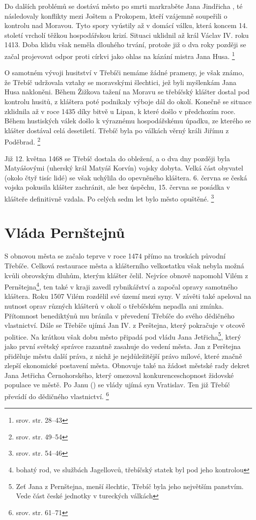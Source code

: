\documentclass[a4paper,oneside,12pt]{report}
\begin{document}
Do dalších problémů se dostává město po smrti markraběte Jana Jindřicha , té následovaly konflikty mezi Joštem a Prokopem, kteří vzájemně soupeřili o kontrolu nad Moravou.
Tyto spory vyústily až v domácí válku, která koncem 14. století vrcholí těžkou hospodářskou krizí.
Situaci uklidnil až král Václav IV. roku 1413.
Doba klidu však neměla dlouhého trvání, protože již o dva roky později se začal projevovat odpor proti církvi jako ohlas na kázání mistra Jana Husa. \footnote{srov. \cite{Uhlir1978} str. 28--43}

O samotném vývoji husitství v Třebíči nemáme žádné prameny, je však známo, že Třebíč udržovala vztahy se moravskými šlechtici, jež byli myšlenkám Jana Husa nakloněni.
Během Žižkova tažení na Moravu se třebíčský klášter dostal pod kontrolu husitů, z kláštera poté podnikaly výboje dál do okolí.
Konečně se situace zklidnila až v roce 1435 díky bitvě u Lipan, k které došlo v předchozím roce.
Během hustiských válek došlo k výraznému hospodářskému úpadku, ze kterého se klášter dostával celá desetiletí.
Třebíč byla po válkách věrný králi Jiřímu z Poděbrad. \footnote{srov.  str. 49--54}

Již 12. května 1468 se Třebíč dostala do obležení, a o dva dny později byla Matyášovými (uherský král Matyáš Korvín) vojsky dobyta.
Velká část obyvatel (okolo čtyř tisíc lidé) se však uchýlila do opevněného kláštera.
6. června se česká vojska pokusila klášter zachránit, ale bez úspěchu, 15. června se posádka v klášteře definitivně vzdala.
Po celých sedm let bylo město opuštěné. \footnote{srov.  str. 54--46}

\section{Vláda Pernštejnů}

S obnovou města se začalo teprve v roce 1474 přímo na troskách původní Třebíče.
Celková restaurace města a klášterního velkostatku však nebyla možná kvůli obrovským dluhům, kterým klášter čelil.
Nejvíce obnově napomohl Vilém z Pernštejna\footnote{bohatý rod, ve službách Jagellovců, třebíčský statek byl pod jeho kontrolou}, ten také v kraji zavedl rybnikářství a započal opravy samotného kláštera.
Roku 1507 Vilém rozdělil své území mezi syny. V závěti také apeloval na nutnost oprav různých klášterů v okolí o třebíčském nepadla ani zmínka.
Přítomnost benediktýnů mu bránila v převedení Třebíče do svého dědičného vlastnictví.
Dále se Třebíče ujímá Jan IV. z Perštejna, který pokračuje v otcově politice.
Na krátkou však dobu město připadá pod vládu Jana Jetřicha\footnote{Zeť Jana z Pernštejna, menší šlechtic, Třebíč byla jeho největším panstvím. Vede část české jednotky v tureckých válkách}, který jako první světský správce razantně zasahuje do vedení města.
Jan z Perštejna přiděluje městu další práva, z nichž je nejdůležitější právo mílové, které značně zlepší ekonomické postavení města.
Obnovuje také na žádost městské rady dekret Jana Jetřicha Černohorského, který omezoval konkurenceschopnost židovské populace ve městě.
Po Janu () se vlády ujímá syn Vratislav.
Ten již Třebíč převádí do dědičného vlastnictví. \footnote{srov.  str. 61--71}
\end{document}
